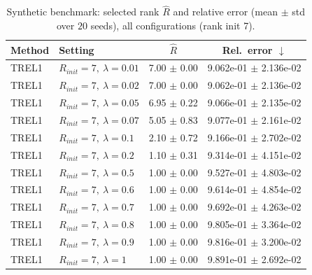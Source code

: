\begin{table}[t]
\centering
\caption{Synthetic benchmark: selected rank \(\hat R\) and relative error (mean \(\pm\) std over \(20\) seeds), all configurations (rank init 7).}
\label{tab:results_synth_all}
\begin{tabular}{@{}llcc@{}}
\toprule
Method & Setting & \(\hat R\) & Rel.\ error \(\downarrow\) \\ \midrule
TREL1 & \(R_{init}=7,\ \lambda=0.01\) & 7.00 $\pm$ 0.00 & 9.062e-01 $\pm$ 2.136e-02 \\
TREL1 & \(R_{init}=7,\ \lambda=0.02\) & 7.00 $\pm$ 0.00 & 9.062e-01 $\pm$ 2.136e-02 \\
TREL1 & \(R_{init}=7,\ \lambda=0.05\) & 6.95 $\pm$ 0.22 & 9.066e-01 $\pm$ 2.135e-02 \\
TREL1 & \(R_{init}=7,\ \lambda=0.07\) & 5.05 $\pm$ 0.83 & 9.077e-01 $\pm$ 2.161e-02 \\
TREL1 & \(R_{init}=7,\ \lambda=0.1\) & 2.10 $\pm$ 0.72 & 9.166e-01 $\pm$ 2.702e-02 \\
TREL1 & \(R_{init}=7,\ \lambda=0.2\) & 1.10 $\pm$ 0.31 & 9.314e-01 $\pm$ 4.151e-02 \\
TREL1 & \(R_{init}=7,\ \lambda=0.5\) & 1.00 $\pm$ 0.00 & 9.527e-01 $\pm$ 4.803e-02 \\
TREL1 & \(R_{init}=7,\ \lambda=0.6\) & 1.00 $\pm$ 0.00 & 9.614e-01 $\pm$ 4.854e-02 \\
TREL1 & \(R_{init}=7,\ \lambda=0.7\) & 1.00 $\pm$ 0.00 & 9.692e-01 $\pm$ 4.263e-02 \\
TREL1 & \(R_{init}=7,\ \lambda=0.8\) & 1.00 $\pm$ 0.00 & 9.805e-01 $\pm$ 3.364e-02 \\
TREL1 & \(R_{init}=7,\ \lambda=0.9\) & 1.00 $\pm$ 0.00 & 9.816e-01 $\pm$ 3.200e-02 \\
TREL1 & \(R_{init}=7,\ \lambda=1\) & 1.00 $\pm$ 0.00 & 9.891e-01 $\pm$ 2.692e-02 \\
\bottomrule
\end{tabular}
\end{table}